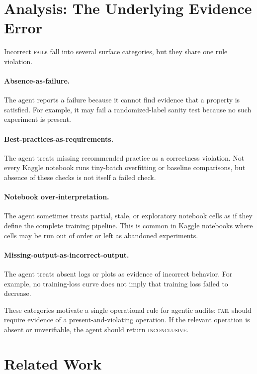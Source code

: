 \documentclass[11pt]{article}
\begin{document}
\section{Analysis: The Underlying Evidence Error}

Incorrect \textsc{fail}s fall into several surface categories, but they share one rule violation.

\paragraph{Absence-as-failure.}
The agent reports a failure because it cannot find evidence that a property is satisfied.
For example, it may fail a randomized-label sanity test because no such experiment is present.

\paragraph{Best-practices-as-requirements.}
The agent treats missing recommended practice as a correctness violation.
Not every Kaggle notebook runs tiny-batch overfitting or baseline comparisons, but absence of these checks is not itself a failed check.

\paragraph{Notebook over-interpretation.}
The agent sometimes treats partial, stale, or exploratory notebook cells as if they define the complete training pipeline.
This is common in Kaggle notebooks where cells may be run out of order or left as abandoned experiments.

\paragraph{Missing-output-as-incorrect-output.}
The agent treats absent logs or plots as evidence of incorrect behavior.
For example, no training-loss curve does not imply that training loss failed to decrease.

These categories motivate a single operational rule for agentic audits:
\textsc{fail} should require evidence of a present-and-violating operation.
If the relevant operation is absent or unverifiable, the agent should return \textsc{inconclusive}.

\section{Related Work}
\end{document}
